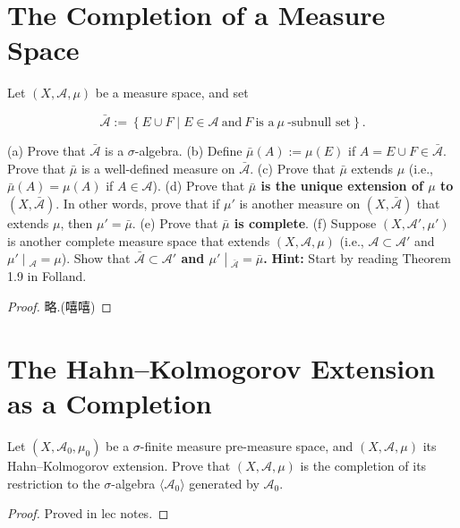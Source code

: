 \documentclass{qlnotes-export}
\begin{document}
\section{The Completion of a Measure Space}\label{the-completion-of-a-measure-space}

Let \((X,\mathcal{A},\mu)\) be a measure space, and set

\[\bar{\mathcal{A}} := \left\{ {E \cup F \mid E \in \mathcal{A}\ \text{and}\ F\ \text{is a}\ \mu\ \text{-subnull set}} \right\}.\]

(a) Prove that \(\bar{\mathcal{A}}\) is a \(\sigma\)-algebra. (b) Define \(\bar{\mu}(A) := \mu(E)\) if \(A = E \cup F \in \bar{\mathcal{A}}\). Prove that \(\bar{\mu}\) is a well-defined measure on \(\bar{\mathcal{A}}\). (c) Prove that \(\bar{\mu}\) extends \(\mu\) (i.e., \(\bar{\mu}(A) = \mu(A)\) if \(A \in \mathcal{A}\)). (d) Prove that \textbf{\(\bar{\mu}\) is the unique extension of \(\mu\) to \((X,\bar{\mathcal{A}})\)}. In other words, prove that if \(\mu'\) is another measure on \((X,\bar{\mathcal{A}})\) that extends \(\mu\), then \(\mu' = \bar{\mu}\). (e) Prove that \textbf{\(\bar{\mu}\) is complete}. (f) Suppose \((X,\mathcal{A}',\mu')\) is another complete measure space that extends \((X,\mathcal{A},\mu)\) (i.e., \(\mathcal{A} \subset \mathcal{A}'\) and \(\left. \mu' \middle| {}_{\mathcal{A}} = \mu \right.\)). Show that \textbf{\(\bar{\mathcal{A}} \subset \mathcal{A}'\) and \(\left. \mu' \middle| {}_{\bar{\mathcal{A}}} = \bar{\mu} \right.\).} \textbf{Hint:} Start by reading Theorem 1.9 in Folland.

\begin{proof}

略.(嘻嘻)

\end{proof}

\section{The Hahn--Kolmogorov Extension as a Completion}\label{the-hahnkolmogorov-extension-as-a-completion}

Let \((X,\mathcal{A}_{0},\mu_{0})\) be a \(\sigma\)-finite measure pre-measure space, and \((X,\mathcal{A},\mu)\) its Hahn--Kolmogorov extension. Prove that \((X,\mathcal{A},\mu)\) is the completion of its restriction to the \(\sigma\)-algebra \(\langle\mathcal{A}_{0}\rangle\) generated by \(\mathcal{A}_{0}\).

\begin{proof}

Proved in lec notes.

\end{proof}
\end{document}
